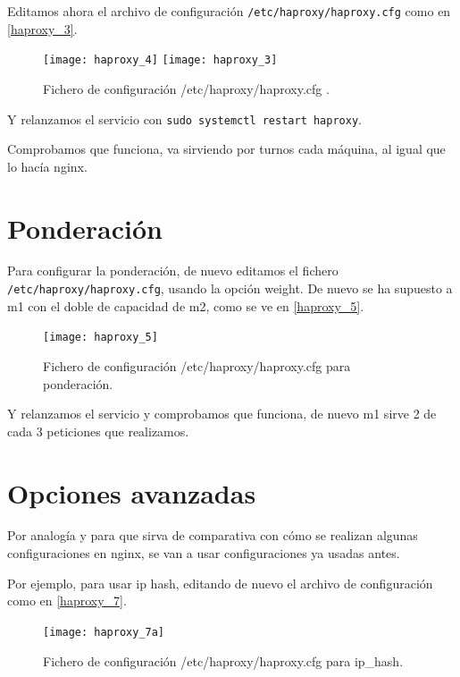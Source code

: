 Editamos ahora el archivo de configuración \verb|/etc/haproxy/haproxy.cfg| como en \eqref{haproxy_3}.

\begin{figure}[h!]
\begin{center}
\caption{Fichero de configuración /etc/haproxy/haproxy.cfg .}
\label{haproxy_3}
\texttt{[image: haproxy\_4]}
\texttt{[image: haproxy\_3]}
\end{center}
\end{figure}

Y relanzamos el servicio con \verb|sudo systemctl restart haproxy|.

Comprobamos que funciona, va sirviendo por turnos cada máquina, al igual que lo hacía nginx.

\section{Ponderación}

Para configurar la ponderación, de nuevo editamos el fichero \verb|/etc/haproxy/haproxy.cfg|, usando la opción weight. De nuevo se ha supuesto a m1 con el doble de capacidad de m2, como se ve en \eqref{haproxy_5}.

\begin{figure}[h!]
\begin{center}
\caption{Fichero de configuración /etc/haproxy/haproxy.cfg para ponderación.}
\label{haproxy_5}
\texttt{[image: haproxy\_5]}
\end{center}
\end{figure}

Y relanzamos el servicio y comprobamos que funciona, de nuevo m1 sirve 2 de cada 3 peticiones que realizamos.

\section{Opciones avanzadas}

Por analogía y para que sirva de comparativa con cómo se realizan algunas configuraciones en nginx, se van a usar configuraciones ya usadas antes.

Por ejemplo, para usar ip hash, editando de nuevo el archivo de configuración como en \eqref{haproxy_7}.

\begin{figure}[h!]
\begin{center}
\caption{Fichero de configuración /etc/haproxy/haproxy.cfg para ip\_hash.}
\label{haproxy_7}
\texttt{[image: haproxy\_7a]}
\end{center}
\end{figure}

